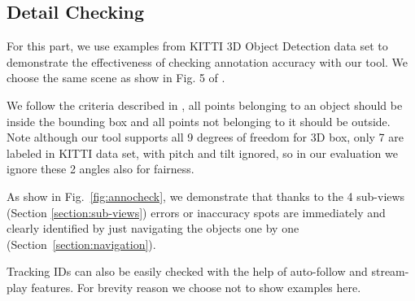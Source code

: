 \documentclass[letterpaper, 10 pt, conference]{ieeeconf}  %
\begin{document}
\subsection{Detail Checking}
For this part, we use examples from KITTI 3D Object Detection data \cite{Geiger2012CVPR} set to demonstrate the effectiveness of checking annotation accuracy with our tool. We choose the same scene as show in  Fig. 5 of \cite{pointatme}.

We follow the criteria  described in \cite{pointatme}, all points belonging to an object should be inside the bounding box and all points not belonging to it should be outside. Note although our tool supports all 9 degrees of freedom for 3D box, only 7 are labeled in KITTI data set, with pitch and tilt ignored, so in our evaluation we ignore these 2 angles also for fairness.

As show in Fig.~\ref{fig:annocheck}, we demonstrate that thanks to the 4 sub-views (Section \ref{section:sub-views}) errors or inaccuracy spots are immediately and clearly identified by just navigating the objects one by one (Section~\ref{section:navigation}).

Tracking IDs can also be easily checked with the help of auto-follow  and stream-play features. For brevity reason we choose not to show examples here.
\end{document}
